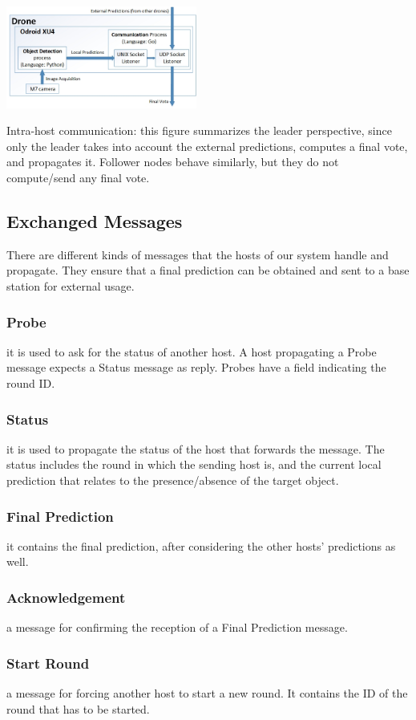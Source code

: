 \documentclass[10pt,conference,compsocconf]{IEEEtran}
\begin{document}
\begin{center}
	\captionsetup{type=figure}
	\includegraphics[width=0.47\textwidth]{img/protocol_sketch_intra_host.jpg}
	\caption {Intra-host communication: this figure summarizes the leader perspective, since only the leader takes into account the external predictions, computes a final vote, and propagates it. Follower nodes behave similarly, but they do not compute/send any final vote.}
	\label{fig:intra_host}
\end{center}
\subsection{Exchanged Messages}
There are different kinds of messages that the hosts of our system handle and propagate. They ensure that a final prediction can be obtained and sent to a base station for external usage.
\subsubsection{Probe} it is used to ask for the status of another host. A host propagating a Probe message expects a Status message as reply. Probes have a field indicating the round ID.
\subsubsection{Status} it is used to propagate the status of the host that forwards the message. The status includes the round in which the sending host is, and the current local prediction that relates to the presence/absence of the target object.
\subsubsection{Final Prediction} it contains the final prediction, after considering the other hosts' predictions as well.
\subsubsection{Acknowledgement} a message for confirming the reception of a Final Prediction message.
\subsubsection{Start Round} a message for forcing another host to start a new round. It contains the ID of the round that has to be started.
\end{document}
